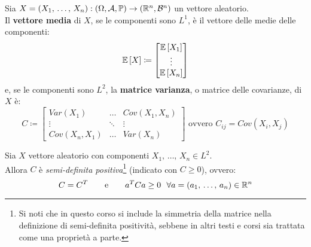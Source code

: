 \begin{defn}
  Sia $X = (X_1, \, \dots, \, X_n): \DoCo$ un vettore aleatorio. \\
  Il \textbf{vettore media} di $X$, se le componenti sono $L^1$, è il vettore delle medie delle componenti:
  $$ \mathbb E \left[ X \right] \coloneqq \begin{bmatrix} \mathbb E \left[ X_1 \right] \\ \vdots \\ \mathbb E \left[ X_n \right] \end{bmatrix} $$
  e, se le componenti sono $L^2$, la \textbf{matrice varianza}, o matrice delle covarianze, di $X$ è:
  $$ C \coloneqq
  \begin{bmatrix} Var(X_1)    & \dots   & Cov(X_1, X_n) \\
          \vdots      & \ddots  & \vdots \\
          Cov(X_n, X_1)   & \dots   & Var(X_n)
  \end{bmatrix}
  \text{ ovvero } C_{ij} = Cov(X_i, X_j)$$
\end{defn}

\medskip
\begin{teob}[\JPTh{12.4}]
  Sia $X$ vettore aleatorio con componenti $X_1, \, \dots, \, X_n \in L^2$. \\
  Allora $C$ è \textit{semi-definita positiva}\footnote{Si noti che in questo corso si include la simmetria della matrice nella definizione di semi-definita positività, sebbene in altri testi e corsi sia trattata come una proprietà a parte.}
  (indicato con $C \geq 0$), ovvero:
  $$ C = C^T \qquad \text{e} \qquad a^T C a \geq 0 \ \ \forall a = (a_1, \, \dots, \, a_n) \in \mathbb R^n$$
\end{teob}

